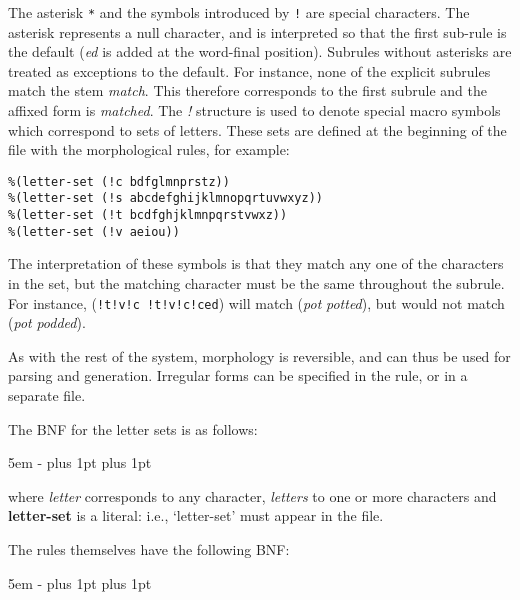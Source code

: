 \documentclass[12pt]{report}
\begin{document}
The asterisk \verb+*+ and the symbols introduced by \verb+!+
are special characters.
The asterisk represents a null character, and is interpreted
so that the first sub-rule is the default ({\it ed} is added at the word-final
position). 
Subrules without asterisks are treated as exceptions to the default.
For instance, none of the explicit subrules match the stem {\it match}.
This therefore corresponds to the first subrule and the affixed form
is {\it matched}.
The {\it !}  structure is used to denote special macro symbols
which correspond to sets of letters. These sets are
defined at the beginning
of the file with the morphological rules, for example:
\begin{verbatim}
%(letter-set (!c bdfglmnprstz))
%(letter-set (!s abcdefghijklmnopqrtuvwxyz))
%(letter-set (!t bcdfghjklmnpqrstvwxz))
%(letter-set (!v aeiou))
\end{verbatim}
The interpretation of these symbols is that they match any one of the
characters in the set, but the matching character must be the same 
throughout the subrule.  For instance, (\verb+!t!v!c !t!v!c!ced+) 
will match ({\it pot} {\it potted}), but would not match 
({\it pot} {\it podded}).
 
As with the rest of the system, morphology is reversible, and can
thus be used for parsing and generation.
Irregular forms can be specified in the rule, or in a separate
file.  

The BNF for the letter sets is as follows:
\begin{list}{}
   {\leftmargin 5em
    \itemindent -\leftmargin
    \itemsep 0pt plus 1pt
    \parsep 0pt plus 1pt}
\end{list}
where {\it letter} corresponds to any character, {\it letters} to one or
more characters and {\bf letter-set} is a literal: i.e., `letter-set' must appear
in the file.

The rules themselves have the following BNF:
\begin{list}{}
   {\leftmargin 5em
    \itemindent -\leftmargin
    \itemsep 0pt plus 1pt
    \parsep 0pt plus 1pt}
\end{list}
\end{document}
